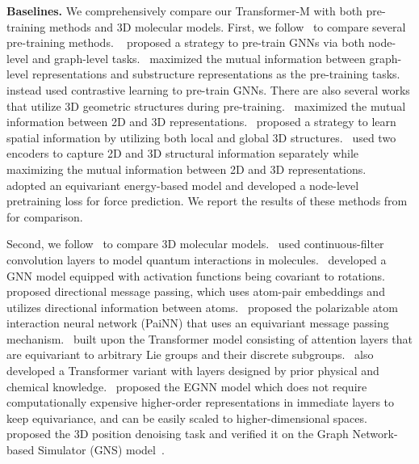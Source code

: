 \documentclass{article} \usepackage[dvipsnames]{xcolor}
\begin{document}
\textbf{Baselines.} 
We comprehensively compare our Transformer-M with both pre-training methods and 3D molecular models. First, we follow~\citet{jiao20223d} to compare several pre-training methods. ~\citet{hu2019strategies} proposed a strategy to pre-train GNNs via both node-level and graph-level tasks.~\citet{sun2019infograph} maximized the mutual information between graph-level representations and substructure representations as the pre-training tasks.~\citet{you2020graph} instead used contrastive learning to pre-train GNNs. There are also several works that utilize 3D geometric structures during pre-training.~\citet{jing2021graph} maximized the mutual information between 2D and 3D representations.~\citet{fang2021chemrl} proposed a strategy to learn spatial information by utilizing both local and global 3D structures.~\citet{stark20223d} used two encoders to capture 2D and 3D structural information separately while maximizing the mutual information between 2D and 3D representations.~\citet{jiao20223d} adopted an equivariant energy-based model and developed a node-level pretraining loss for force prediction. We report the results of these methods from~\citep{jiao20223d} for comparison.

Second, we follow~\citet{tholke2021equivariant} to compare 3D molecular models.~\citet{schutt2017schnet} used continuous-filter convolution layers to model quantum interactions in molecules.~\citet{anderson2019cormorant} developed a GNN model equipped with activation functions being covariant to rotations.~\citet{klicpera2020directional} proposed directional message passing, which uses atom-pair embeddings and utilizes directional information between atoms.~\citet{schutt2021equivariant} proposed the polarizable atom interaction neural network (PaiNN) that uses an equivariant message passing mechanism.~\citet{hutchinson2021lietransformer} built upon the Transformer model consisting of attention layers that are equivariant to arbitrary Lie groups and their discrete subgroups.~\citet{tholke2021equivariant} also developed a Transformer variant with layers designed by prior physical and chemical knowledge.~\citet{satorras2021n} proposed the EGNN model which does not require computationally expensive higher-order representations in immediate layers to keep equivariance, and can be easily scaled to higher-dimensional spaces.~\citet{godwin2022simple} proposed the 3D position denoising task and verified it on the Graph Network-based Simulator (GNS) model~\citep{pmlr-v119-sanchez-gonzalez20a}.
\end{document}
